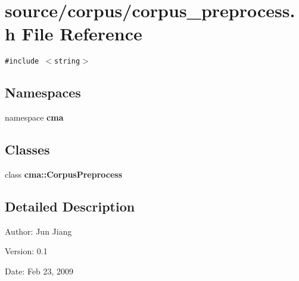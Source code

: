 \section{source/corpus/corpus\_\-preprocess.h File Reference}
\label{corpus__preprocess_8h}
{\tt \#include $<$string$>$}\par
\subsection*{Namespaces}
\begin{CompactItemize}
\item 
namespace \textbf{cma}
\end{CompactItemize}
\subsection*{Classes}
\begin{CompactItemize}
\item 
class {\bf cma::CorpusPreprocess}
\end{CompactItemize}


\subsection{Detailed Description}
\begin{Desc}
\item[Author:]Jun Jiang \end{Desc}
\begin{Desc}
\item[Version:]0.1 \end{Desc}
\begin{Desc}
\item[Date:]Feb 23, 2009 \end{Desc}
